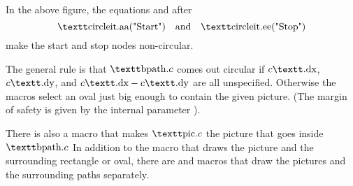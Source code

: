 In the above figure, the equations  and  after
$$ \lit{circleit.aa("Start")}
    \quad{\rm and}\quad \lit{circleit.ee("Stop")}
$$
make the start and stop nodes non-circular.

The general rule is that $\lit{bpath.}c$ comes out circular if
$c\lit{.dx}$, $c\lit{.dy}$, and $c\lit{.dx}-c\lit{.dy}$ are all unspecified.
Otherwise the macros select an oval just big enough to contain the given
picture.  (The margin of safety is given by the internal parameter
).

There is also a  macro that makes $\lit{pic.}c$ the picture that
goes inside $\lit{bpath.}c$  In addition to the  macro
that draws the picture and the surrounding rectangle or oval, there are
 and  macros that draw the pictures and
the surrounding paths separately.

\bye
